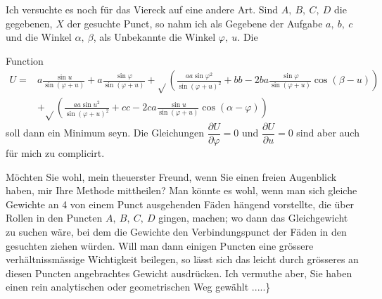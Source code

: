 \indent Ich versuchte es noch für das Viereck auf eine andere Art. Sind \(A,\ B,\ C,\ D\) die gegebenen, \(X\) der gesuchte Punct, so nahm ich als Gegebene der Aufgabe \(a,\ b,\ c\) und die Winkel \(\alpha,\ \beta\), als Unbekannte die Winkel \(\varphi,\ u\). Die
\begin{center}
\end{center}
\clearpage{}
\noindent Function
\[
\begin{aligned}
U={}&a\frac{\sin u}{\sin(\varphi+u)}+a\frac{\sin\varphi}{\sin(\varphi+u)}
+\surd\!\left(\frac{aa\sin\varphi^2}{\sin(\varphi+u)^2}+bb-2ba\frac{\sin\varphi}{\sin(\varphi+u)}\cos(\beta-u)\right)\\[1em]
&+\surd\!\left(\frac{aa\sin u^2}{\sin(\varphi+u)^2}+cc-2ca\frac{\sin u}{\sin(\varphi+u)}\cos(\alpha-\varphi)\right)
\end{aligned}
\]
\noindent soll dann ein Minimum seyn. Die Gleichungen \(\dfrac{\partial U}{\partial\varphi}=0\) und \(\dfrac{\partial U}{\partial u}=0\) sind aber auch für mich zu complicirt.

\indent Möchten Sie wohl, mein theuerster Freund, wenn Sie einen freien Augenblick haben, mir Ihre Methode mittheilen? Man könnte es wohl, wenn man sich gleiche Gewichte an 4 von einem Punct ausgehenden Fäden hängend vorstellte, die über Rollen in den Puncten \(A,\ B,\ C,\ D\) gingen, machen; wo dann das Gleichgewicht zu suchen wäre, bei dem die Gewichte den Verbindungspunct der Fäden in den gesuchten ziehen würden. Will man dann einigen Puncten eine grössere verhältnissmässige Wichtigkeit beilegen, so lässt sich das leicht durch grösseres an diesen Puncten angebrachtes Gewicht ausdrücken. Ich vermuthe aber, Sie haben einen rein analytischen oder geometrischen Weg gewählt .\enspace.\enspace.\enspace.\enspace.\}

